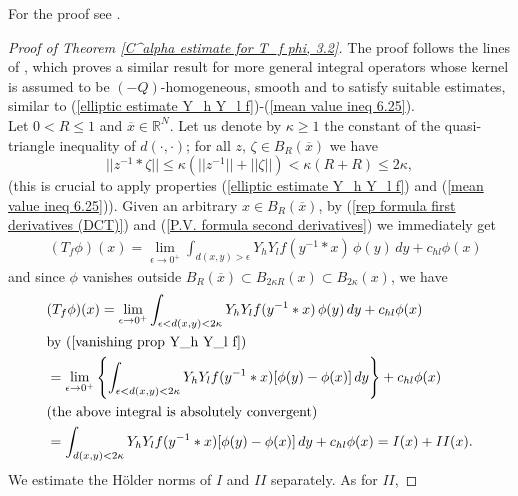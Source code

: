 \documentclass{article}
\numberwithin{equation}{section}
\begin{document}
For the proof see \cite[Corollary 1.6]{Fo2}.

\vspace{2mm}

\begin{proof}[Proof of Theorem \ref{C^alpha estimate for T_f phi, 3.2}]
    The proof follows the lines of \cite[Lemma 2.7]{Hölder spaces: original vs lifted}, which proves a similar result for more general integral operators whose kernel is assumed to be $(-Q)$-homogeneous, smooth and to satisfy suitable estimates, similar to (\ref{elliptic estimate Y_h Y_l f})-(\ref{mean value ineq 6.25}). \\Let $0<R \leq 1$ and $\overline{x} \in \mathbb{R}^N$. Let us denote by $\kappa \geq 1$ the constant of the quasi-triangle inequality of $d(\cdot,\cdot)$; for all $z, \, \zeta \in B_R(\overline{x})$ we have
    \begin{equation*}
        ||z^{-1} * \zeta|| \leq \kappa(||z^{-1}||+||\zeta||) < \kappa(R+R) \leq 2 \kappa,
    \end{equation*}
     (this is crucial to apply properties (\ref{elliptic estimate Y_h Y_l f}) and (\ref{mean value ineq 6.25})). Given an arbitrary $x \in B_R(\overline{x})$, by (\ref{rep formula first derivatives (DCT)}) and (\ref{P.V. formula second derivatives}) we immediately get
    \begin{align*}
        & (T_f \phi)(x) = \lim_{\epsilon \to 0^+} \int_{d(x,y)>\epsilon} Y_h Y_l f(y^{-1} * x) \, \phi(y) \, dy + c_{hl} \phi(x)
    \end{align*}
    and since $\phi$ vanishes outside $B_R(\overline{x}) \subset B_{2\kappa R}(x) \subset B_{2\kappa}(x)$, we have
    \begin{align}
        & \nonumber (T_f \phi)(x) = \lim_{\epsilon \to 0^+} \int_{\epsilon < d(x,y) < 2 \kappa} Y_h Y_l f(y^{-1} * x) \, \phi(y) \, dy + c_{hl} \phi(x) \\
        & \nonumber \text{by (\ref{vanishing prop Y_h Y_l f})} \\
        & \nonumber = \lim_{\epsilon \to 0^+} \left\{\int_{\epsilon < d(x,y) < 2\kappa} Y_h Y_l f(y^{-1} * x) [\phi(y)-\phi(x)] \, dy \right\} + c_{hl} \phi(x) \\
        & \nonumber (\text{the above integral is absolutely convergent}) \\
        & \label{split of T_f phi in I and II} = \int_{d(x,y) < 2\kappa} Y_h Y_l f(y^{-1} * x) [\phi(y)-\phi(x)] \, dy + c_{hl} \phi(x) = I(x)+II(x).
    \end{align}
    We estimate the Hölder norms of $I$ and $II$ separately. As for $II$, 

\end{proof}
\end{document}
